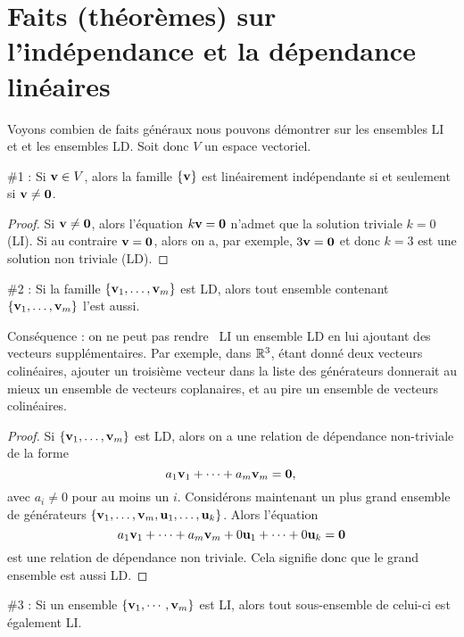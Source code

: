 \section{Faits (théorèmes) sur l'indépendance et la dépendance linéaires}
Voyons combien de faits généraux nous pouvons démontrer sur les ensembles LI et et les ensembles LD. 
Soit donc $V$ un espace vectoriel.


\begin{fac} \#1 : Si $\mathbf{v} \in V$, alors la famille $\{ \mathbf{v} \}$ est linéairement indépendante si et seulement si $\mathbf{v} \neq \mathbf{0}$.  \end{fac}

\begin{proof} Si $\mathbf{v} \neq \mathbf{0}$, alors l'équation $k\mathbf{v} = \mathbf{0}$ n'admet que la solution triviale $k=0$ (LI).
Si au contraire $\mathbf{v} = \mathbf{0}$, alors on a, par exemple, $3\mathbf{v} = \mathbf{0}$ et donc $k=3$ est une solution non triviale (LD). \end{proof}


\begin{fac} \#2 : \label{fact 2}
Si la famille $\{\mathbf{v}_1, \dots, \mathbf{v}_m\}$ est LD, alors tout ensemble contenant
$\{\mathbf{v}_1, \dots, \mathbf{v}_m\}$ l'est aussi.\end{fac}

Conséquence : on ne peut pas \og rendre \fg\ LI un ensemble LD en lui ajoutant des vecteurs supplémentaires.
Par exemple, dans $\mathbb{R}^3$, \'etant donn\'e deux vecteurs colinéaires,  ajouter un troisième vecteur dans la liste des g\'en\'erateurs donnerait au mieux un ensemble de vecteurs coplanaires, et au pire un ensemble de vecteurs colinéaires.

\begin{proof} Si $\{\mathbf{v}_1, \dots, \mathbf{v}_m\}$ est LD, alors on a une relation de dépendance non-triviale de la forme
$$
a_1\mathbf{v}_1 + \cdots + a_m \mathbf{v}_m = \mathbf{0},\, 
$$ 
avec $a_i \neq 0$ pour au moins un $i$.  Considérons maintenant un plus grand ensemble de générateurs $\{ \mathbf{v}_1, \ldots, \mathbf{v}_m, \mathbf{u}_1, \dots, \mathbf{u}_k\}$.  
Alors l'équation
$$
 a_1\mathbf{v}_1 + \cdots + a_m \mathbf{v}_m + 0\mathbf{u}_{1} + \cdots + 0\mathbf{u}_k = \mathbf{0}
$$
est une relation de d\'ependance non triviale.  Cela signifie donc que le grand ensemble est aussi LD. \end{proof}

\begin{fac}\#3 : Si un ensemble $\{ \mathbf{v}_1, \cdots, \mathbf{v}_m\}$ est LI, alors tout sous-ensemble de celui-ci est également LI.\end{fac}


